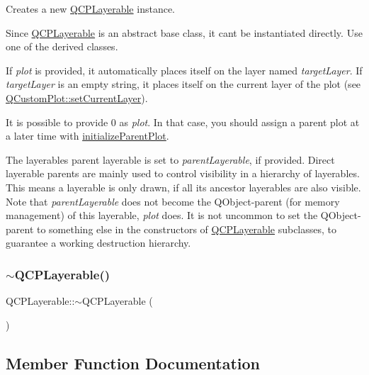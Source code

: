 Creates a new \mbox{\hyperlink{class_q_c_p_layerable}{Q\+C\+P\+Layerable}} instance.

Since \mbox{\hyperlink{class_q_c_p_layerable}{Q\+C\+P\+Layerable}} is an abstract base class, it can\textquotesingle{}t be instantiated directly. Use one of the derived classes.

If {\itshape plot} is provided, it automatically places itself on the layer named {\itshape target\+Layer}. If {\itshape target\+Layer} is an empty string, it places itself on the current layer of the plot (see \mbox{\hyperlink{class_q_custom_plot_a73a6dc47c653bb6f8f030abca5a11852}{Q\+Custom\+Plot\+::set\+Current\+Layer}}).

It is possible to provide 0 as {\itshape plot}. In that case, you should assign a parent plot at a later time with \mbox{\hyperlink{class_q_c_p_layerable_a8cbe5a0c9a5674249982f5ca5f8e02bc}{initialize\+Parent\+Plot}}.

The layerable\textquotesingle{}s parent layerable is set to {\itshape parent\+Layerable}, if provided. Direct layerable parents are mainly used to control visibility in a hierarchy of layerables. This means a layerable is only drawn, if all its ancestor layerables are also visible. Note that {\itshape parent\+Layerable} does not become the Q\+Object-\/parent (for memory management) of this layerable, {\itshape plot} does. It is not uncommon to set the Q\+Object-\/parent to something else in the constructors of \mbox{\hyperlink{class_q_c_p_layerable}{Q\+C\+P\+Layerable}} subclasses, to guarantee a working destruction hierarchy. \mbox{\label{class_q_c_p_layerable_a4231cf5b3601d6d3a5781283e7a9735b}} 
\subsubsection{\texorpdfstring{$\sim$QCPLayerable()}{~QCPLayerable()}}
{\footnotesize\ttfamily Q\+C\+P\+Layerable\+::$\sim$\+Q\+C\+P\+Layerable (\begin{DoxyParamCaption}{ }\end{DoxyParamCaption})\hspace{0.3cm}{\ttfamily [virtual]}}



\subsection{Member Function Documentation}
\mbox{\label{class_q_c_p_layerable_a71cbd212fde2703cee076e204a475709}} 
